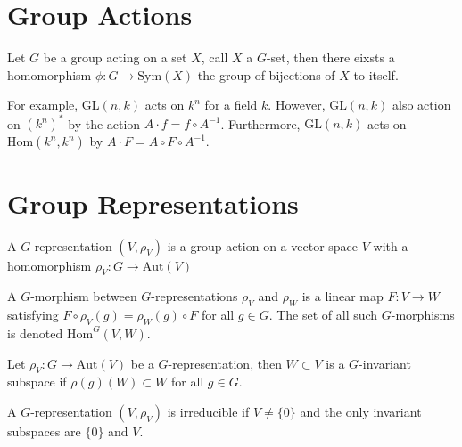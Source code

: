 \documentclass[12pt]{extarticle}
\newcommand{\Sym}[1]{\mathrm{Sym}(#1)}
\newcommand{\GL}[2]{\mathrm{GL}(#1, #2)}
\newcommand{\Hom}[2]{\mathrm{Hom}\left( #1, #2 \right)}
\newcommand{\aut}[1]{\mathrm{Aut}\left( #1 \right)}
\newcommand{\repHom}[3]{\mathrm{Hom}^{#1} \left( #2, #3 \right)}
\theoremstyle{definition}
\newenvironment{definition}[1][Definition:]{\begin{trivlist}
\item[\hskip \labelsep {\bfseries #1}]}{\end{trivlist}}
\begin{document}
\section{Group Actions}
\begin{definition}
Let $G$ be a group acting on a set $X$, call $X$ a $G$-set, then there eixsts a homomorphism $\phi : G \to \Sym{X}$ the group of bijections of $X$ to itself. 
\end{definition}
For example, $\GL{n}{k}$ acts on $k^n$ for a field $k$. However, $\GL{n}{k}$ also action on $(k^n)^*$ by the action $A \cdot f = f \circ A^{-1}$. Furthermore, $\GL{n}{k}$ acts on $\Hom{k^n}{k^n}$ by $A \cdot F = A \circ F \circ A^{-1}$.  


\section{Group Representations}
\begin{definition}
A $G$-representation $(V, \rho_V)$ is a group action on a vector space $V$ with a homomorphism $\rho_V : G \to \aut{V}$ 
\end{definition}

\begin{definition}
A $G$-morphism between $G$-representations $\rho_V$ and $\rho_W$ is a linear map $F : V \to W$ satisfying $F \circ \rho_V(g) = \rho_W(g) \circ F$ for all $g \in G$. The set of all such $G$-morphisms is denoted $\repHom{G}{V}{W}$.  
\end{definition}

\begin{definition}
Let $\rho_V : G \to \aut{V}$ be a $G$-representation, then $W \subset V$ is a $G$-invariant subspace if $\rho(g)(W) \subset W$ for all $g \in G$.
\end{definition}

\begin{definition}
A $G$-representation $(V, \rho_V)$ is irreducible if $V \neq \{0\}$ and the only invariant subspaces are $\{0\}$ and $V$. 
\end{definition}
\end{document}
